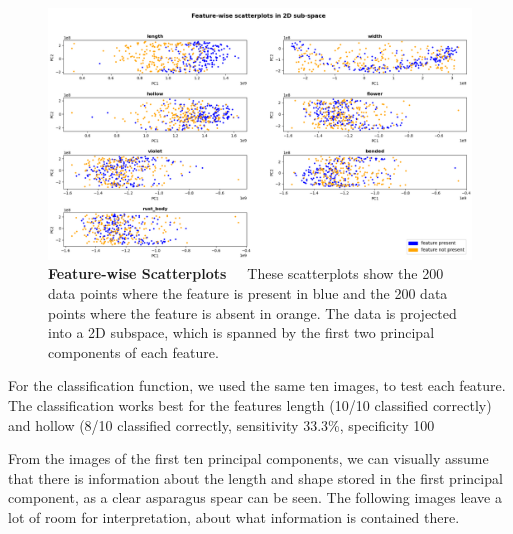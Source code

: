 \begin{figure}[h]
    \centering
    \includegraphics[scale=0.35]{Figures/chapter04/pca_scatterplot.png}
    \decoRule
    \caption[Feature-Wise Scatterplots]{\textbf{Feature-wise Scatterplots}~~~These scatterplots show the 200 data points where the feature is present in blue and the 200 data points where the feature is absent in orange. The data is projected into a 2D subspace, which is spanned by the first two principal components of each feature.}
    \label{fig:PCAscatter}
\end{figure}

For the classification function, we used the same ten images, to test each feature. The classification works best for the features length (10/10 classified correctly) and hollow (8/10 classified correctly, sensitivity 33.3\%, specificity 100%

From the images of the first ten principal components, we can visually assume that there is information about the length and shape stored in the first principal component, as a clear asparagus spear can be seen. The following images leave a lot of room for interpretation, about what information is contained there.

